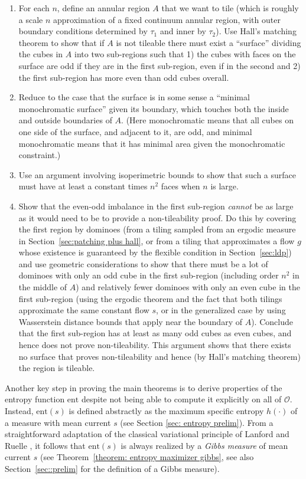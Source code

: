 \documentclass[11pt]{article}
\theoremstyle{remark}
\theoremstyle{definition}
\newcommand{\ent}{\text{ent}}
\newcommand{\mc}[1]{\mathcal{#1}}
\begin{document}
\begin{enumerate}
    \item For each $n$, define an annular region $A$ that we want to tile (which is roughly a scale $n$ approximation of a fixed continuum annular region, with outer boundary conditions determined by $\tau_1$ and inner by $\tau_2$). Use Hall's matching theorem to show that if $A$ is not tileable there must exist a ``surface'' dividing the cubes in $A$ into two sub-regions such that 1) the cubes with faces on the surface are odd if they are in the first sub-region, even if in the second and 2) the first sub-region has more even than odd cubes overall.
    \item Reduce to the case that the surface is in some sense a ``minimal monochromatic surface'' given its boundary, which touches both the inside and outside boundaries of $A$. (Here monochromatic means that all cubes on one side of the surface, and adjacent to it, are odd, and minimal monochromatic means that it has minimal area given the monochromatic constraint.)
    \item Use an argument involving isoperimetric bounds to show that such a surface must have at least a constant times $n^2$ faces when $n$ is large.
    \item Show that the even-odd imbalance in the first sub-region {\em cannot} be as large as it would need to be to provide a non-tileability proof. Do this by covering the first region by dominoes (from a tiling sampled from an ergodic measure in Section~\ref{sec:patching plus hall}, or from a tiling that approximates a flow $g$ whose existence is guaranteed by the flexible condition in Section~\ref{sec:ldp}) and use geometric considerations to show that there must be a lot of dominoes with only an odd cube in the first sub-region (including order $n^2$ in the middle of $A$) and relatively fewer dominoes with only an even cube in the first sub-region (using the ergodic theorem and the fact that both tilings approximate the same constant flow $s$, or in the generalized case by using Wasserstein distance bounds that apply near the boundary of $A$). Conclude that the first sub-region has at least as many odd cubes as even cubes, and hence does not prove non-tileability. This argument shows that there exists no surface that proves non-tileability and hence (by Hall's matching theorem) the region is tileable.  
\end{enumerate}

Another key step in proving the main theorems is to derive properties of the entropy function $\ent$ despite not being able to compute it explicitly on all of $\mc O$. Instead, $\ent(s)$ is defined abstractly as the maximum specific entropy $h(\cdot)$ of a measure with mean current $s$ (see Section \ref{sec: entropy prelim}). From a straightforward adaptation of the classical variational principle of Lanford and Ruelle \cite{LanfordRuelle}, it follows that $\ent(s)$ is always realized by a \textit{Gibbs measure} of mean current $s$ (see Theorem~\ref{theorem: entropy maximizer gibbs}, see also Section~\ref{sec::prelim} for the definition of a Gibbs measure). 
\end{document}

